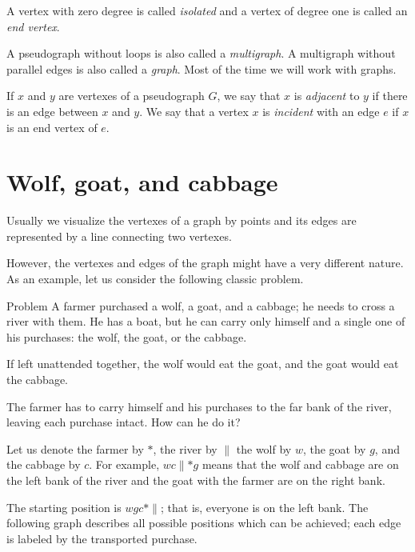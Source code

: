 A vertex with zero degree is called \emph{isolated} and a vertex of degree one is called an \emph{end vertex}.

\smallskip

A pseudograph without loops is also called a \emph{multigraph}.
A multigraph without parallel edges is also called a \emph{graph}.
Most of the time we will work with graphs.

If $x$ and $y$ are vertexes of a pseudograph $G$, we say that $x$ is \emph{adjacent} to $y$ if there is an edge between $x$ and $y$.
We say that a vertex $x$ is \emph{incident} with an edge $e$ if $x$ is an end vertex of $e$.

\section*{Wolf, goat, and cabbage}

Usually we visualize the vertexes of a graph by points
and its edges are represented by a line connecting two vertexes.

However, the vertexes and edges of the graph might have a very different nature.
As an example, let us consider the following classic problem.

\begin{thm}{Problem}
A farmer purchased a wolf, a goat, and a cabbage;
he needs to cross a river with them.
He has a boat, but he can carry only himself and a single one of his purchases: the wolf, the goat, or the cabbage.

If left unattended together, the wolf would eat the goat, and the goat would eat the cabbage.

The farmer has to carry himself and his purchases to the far bank of the river, leaving each purchase intact. How can he do it?
\end{thm}

Let us denote the farmer by $*$, the river by ${\parallel}$
the wolf by $w$, the goat by $g$, and the cabbage by $c$.
For example, $wc{\parallel}{*}g$ means that the wolf and cabbage are on the left bank of the river and the goat with the farmer are on the right bank.

{\sloppy

The starting position is $wgc{*}{\parallel}$; that is, everyone is on the left bank.
The following graph describes all possible positions which can be achieved;
each edge is labeled by the transported purchase.

}

